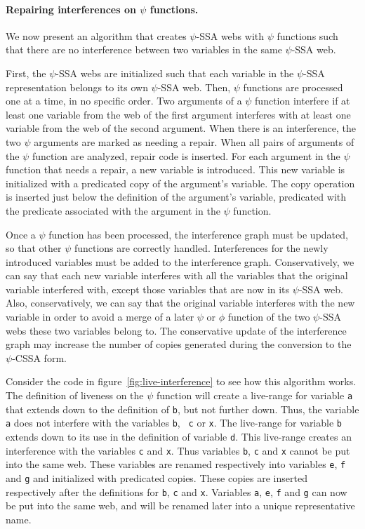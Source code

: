 \paragraph{Repairing interferences on $\psi$ functions.}
We now present an algorithm that creates $\psi$-SSA webs with $\psi$
functions such that there are no interference between two variables in
the same $\psi$-SSA web.

First, the $\psi$-SSA webs are initialized such that each variable in
the $\psi$-SSA representation belongs to its own $\psi$-SSA web. Then,
$\psi$ functions are processed one at a time, in no specific
order. Two arguments of a $\psi$ function interfere if at least one
variable from the web of the first argument interferes with at least
one variable from the web of the second argument. When there is an
interference, the two $\psi$ arguments are marked as needing a
repair. When all pairs of arguments of the $\psi$ function are
analyzed, repair code is inserted. For each argument in the $\psi$
function that needs a repair, a new variable is introduced. This new
variable is initialized with a predicated copy of the argument's
variable. The copy operation is inserted just below the definition of
the argument's variable, predicated with the predicate associated with
the argument in the $\psi$ function.

Once a $\psi$ function has been processed, the interference graph must
be updated, so that other $\psi$ functions are correctly
handled. Interferences for the newly introduced variables must be
added to the interference graph. Conservatively, we can say that each
new variable interferes with all the variables that the original
variable interfered with, except those variables that are now in its
$\psi$-SSA web. Also, conservatively, we can say that the original
variable interferes with the new variable in order to avoid a merge of
a later $\psi$ or $\phi$ function of the two $\psi$-SSA webs these
two variables belong to. The conservative update of the interference
graph may increase the number of copies generated during the
conversion to the $\psi$-CSSA form.

Consider the code in figure~\ref{fig:live-interference} to see how
this algorithm works. The definition of liveness on the $\psi$
function will create a live-range for variable {\tt a} that extends
down to the definition of {\tt b}, but not further down. Thus, the
variable {\tt a} does not interfere with the variables {\tt b}, {\tt
  c} or {\tt x}. The live-range for variable {\tt b} extends down to
its use in the definition of variable {\tt d}. This live-range creates
an interference with the variables {\tt c} and {\tt x}. Thus variables
{\tt b}, {\tt c} and {\tt x} cannot be put into the same web. These
variables are renamed respectively into variables {\tt e}, {\tt f} and
{\tt g} and initialized with predicated copies. These copies are
inserted respectively after the definitions for {\tt b}, {\tt c} and
{\tt x}. Variables {\tt a}, {\tt e}, {\tt f} and {\tt g} can now be
put into the same web, and will be renamed later into a unique
representative name.

